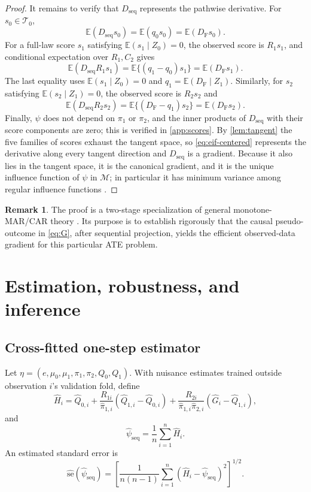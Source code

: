 \documentclass[11pt]{article}
\theoremstyle{definition}
\newtheorem{remark}{Remark}
\newcommand{\E}{\mathbb{E}}
\newcommand{\1}{\mathbf{1}}
\newcommand{\seq}{\mathrm{seq}}
\newcommand{\F}{\mathrm{F}}
\begin{document}
\begin{proof}
It remains to verify that $D_{\seq}$ represents the pathwise derivative. For $s_0\in\mathcal T_0$,
\[
\E(D_{\seq}s_0)=\E(q_0s_0)=\E(D_{\F}s_0).
\]
For a full-law score $s_1$ satisfying $\E(s_1\mid Z_0)=0$, the observed score is $R_1s_1$, and conditional expectation over $R_1,C_2$ gives
\[
\E(D_{\seq}R_1s_1)=\E\{(q_1-q_0)s_1\}=\E(D_{\F}s_1).
\]
The last equality uses $\E(s_1\mid Z_0)=0$ and $q_1=\E(D_{\F}\mid Z_1)$. Similarly, for $s_2$ satisfying $\E(s_2\mid Z_1)=0$, the observed score is $R_2s_2$ and
\[
\E(D_{\seq}R_2s_2)=\E\{(D_{\F}-q_1)s_2\}=\E(D_{\F}s_2).
\]
Finally, $\psi$ does not depend on $\pi_1$ or $\pi_2$, and the inner products of
$D_{\seq}$ with their score components are zero; this is verified in
\cref{app:scores}. By \cref{lem:tangent} the five families of scores exhaust the
tangent space, so \cref{eq:eif-centered} represents the derivative along every
tangent direction and $D_{\seq}$ is a gradient. Because it also lies in the
tangent space, it is the canonical gradient, and it is the unique influence
function of $\psi$ in $\mathcal M$; in particular it has minimum variance among
regular influence functions \citep{tsiatis2006}.
\end{proof}

\begin{remark}
The proof is a two-stage specialization of general monotone-MAR/CAR theory \citep{rrz1994,gill1997,barnwell2025}. Its purpose is to establish rigorously that the causal pseudo-outcome in \cref{eq:G}, after sequential projection, yields the efficient observed-data gradient for this particular ATE problem.
\end{remark}

\section{Estimation, robustness, and inference}

\subsection{Cross-fitted one-step estimator}

Let $\eta=(e,\mu_0,\mu_1,\pi_1,\pi_2,Q_0,Q_1)$. With nuisance estimates trained outside observation $i$'s validation fold, define
\begin{equation}\label{eq:Hhat}
\widehat H_i=\widehat Q_{0,i}
+\frac{R_{1i}}{\widehat\pi_{1,i}}(\widehat Q_{1,i}-\widehat Q_{0,i})
+\frac{R_{2i}}{\widehat\pi_{1,i}\widehat\pi_{2,i}}
(\widehat G_i-\widehat Q_{1,i}),
\end{equation}
and
\begin{equation}\label{eq:estimator}
\widehat\psi_{\seq}=\frac{1}{n}\sum_{i=1}^n\widehat H_i.
\end{equation}
An estimated standard error is
\begin{equation}\label{eq:se}
\widehat{\mathrm{se}}(\widehat\psi_{\seq})
=\left[\frac{1}{n(n-1)}\sum_{i=1}^n
(\widehat H_i-\widehat\psi_{\seq})^2\right]^{1/2}.
\end{equation}
\end{document}
